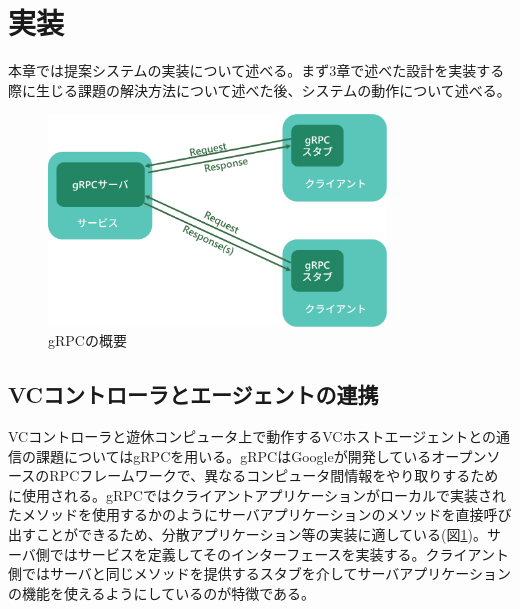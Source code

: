 \section{実装}
本章では提案システムの実装について述べる。まず3章で述べた設計を実装する際に生じる課題の解決方法について述べた後、システムの動作について述べる。




\begin{figure}[t]
    \centering
    \includegraphics[width=0.8\textwidth,keepaspectratio,clip]{img/grpc.eps}
    \caption{gRPCの概要}
    \label{fig:grpc}
\end{figure}

\subsection{VCコントローラとエージェントの連携}
VCコントローラと遊休コンピュータ上で動作するVCホストエージェントとの通信の課題についてはgRPC\cite{grpc}を用いる。gRPCはGoogleが開発しているオープンソースのRPCフレームワークで、異なるコンピュータ間情報をやり取りするために使用される。gRPCではクライアントアプリケーションがローカルで実装されたメソッドを使用するかのようにサーバアプリケーションのメソッドを直接呼び出すことができるため、分散アプリケーション等の実装に適している(図\ref{fig:grpc})。サーバ側ではサービスを定義してそのインターフェースを実装する。クライアント側ではサーバと同じメソッドを提供するスタブを介してサーバアプリケーションの機能を使えるようにしているのが特徴である。

